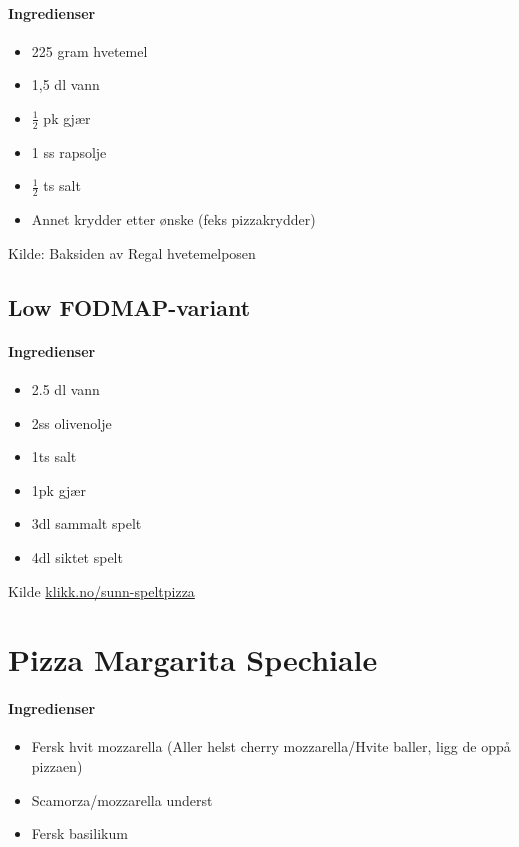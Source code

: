 \documentclass[12pt,a4paper]{book}
\begin{document}
{\paragraph{Ingredienser}
\begin{itemize}[noitemsep]
	\item 225 gram hvetemel
	\item 1,5 dl vann
	\item $\frac{1}{2}$ pk gjær
	\item 1 ss rapsolje
	\item $\frac{1}{2}$ ts salt
	\item Annet krydder etter ønske (feks pizzakrydder)
\end{itemize}



Kilde: Baksiden av Regal hvetemelposen

\subsection{Low FODMAP-variant}

\paragraph{Ingredienser}
\begin{itemize}[noitemsep]
	\item 2.5 dl vann
	\item 2ss olivenolje
	\item 1ts salt
	\item 1pk gjær
	\item 3dl sammalt spelt
	\item 4dl siktet spelt
\end{itemize}



Kilde \href{http://oppskrift.klikk.no/sunn-speltpizza/2795/f}{klikk.no/sunn-speltpizza}
\clearpage{}
\clearpage{}\section{﻿Pizza Margarita Spechiale}


\paragraph{Ingredienser}
\begin{itemize}[noitemsep]
	\item Fersk hvit mozzarella (Aller helst cherry mozzarella/Hvite baller, ligg de oppå pizzaen)
	\item Scamorza/mozzarella underst
	\item Fersk basilikum
\end{itemize}


}
\end{document}
